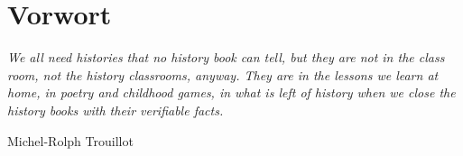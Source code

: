 \documentclass[11pt]{article}
\begin{document}
 
\section{Vorwort}

\setlength{\epigraphwidth}{0.7\textwidth}

\epigraph{\textit{We all need histories that no history book can tell,
      but they are not in the class room, not the history classrooms, anyway. 
      They are in the lessons we learn at home, in poetry and childhood games, 
      in what is left of history when we close the history books with their verifiable facts.}}{Michel-Rolph Trouillot}
\end{document}
